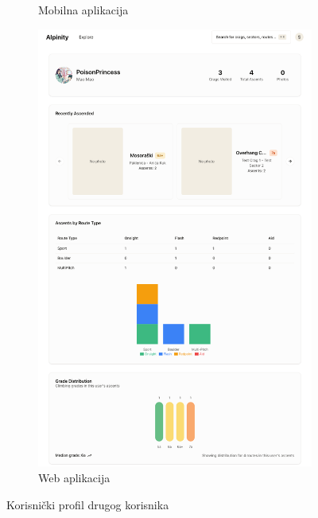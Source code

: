 \begin{figure}[H]
\begin{subfigure}[b]{0.33\textwidth}
        \caption{Mobilna aplikacija}
        \label{fig:korisnicki_profil_other_mob}
    \end{subfigure}
    \hfill
    \begin{subfigure}[b]{0.65\textwidth}
        \centering
        \includegraphics[width=\textwidth]{images/implementacija/web/user-profile-other.png}
        \caption{Web aplikacija}
        \label{fig:korisnicki_profil_other_web}
    \end{subfigure}
    \caption{Korisnički profil drugog korisnika}
    \label{fig:korisnički_profil_other}
\end{figure}
